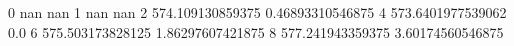 0 nan nan
1 nan nan
2 574.109130859375 0.46893310546875
4 573.6401977539062 0.0
6 575.503173828125 1.86297607421875
8 577.241943359375 3.60174560546875
